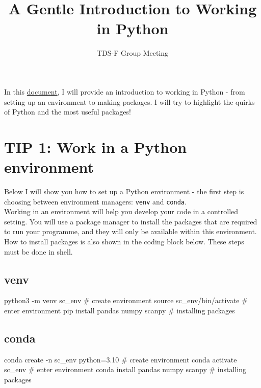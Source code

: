 \documentclass[
  letterpaper,
  DIV=11,
  numbers=noendperiod]{scrartcl}
\title{A Gentle Introduction to Working in Python}
\subtitle{TDS-F Group Meeting}
\author{}
\date{}
\newenvironment{Shaded}{\begin{snugshade}}{\end{snugshade}}
\newcommand{\AttributeTok}[1]{\textcolor[rgb]{0.40,0.45,0.13}{#1}}
\newcommand{\BuiltInTok}[1]{\textcolor[rgb]{0.00,0.23,0.31}{#1}}
\newcommand{\CommentTok}[1]{\textcolor[rgb]{0.37,0.37,0.37}{#1}}
\newcommand{\ExtensionTok}[1]{\textcolor[rgb]{0.00,0.23,0.31}{#1}}
\newcommand{\NormalTok}[1]{\textcolor[rgb]{0.00,0.23,0.31}{#1}}
\renewcommand*\contentsname{Table of contents}
\newcommand\contentsname{Table of contents}
\begin{document}
\maketitle

\renewcommand*\contentsname{Table of contents}
{
\hypersetup{linkcolor=}
\setcounter{tocdepth}{3}
\tableofcontents
}

In this
\href{https://tkjmk.github.io/PyBestPractices_SIB/PythonIntro_SIB.html}{document},
I will provide an introduction to working in Python - from setting up an
environment to making packages. I will try to highlight the quirks of
Python and the most useful packages!

\section{TIP 1: Work in a Python
environment}\label{tip-1-work-in-a-python-environment}

Below I will show you how to set up a Python environment - the first
step is choosing between environment managers: \texttt{venv} and
\texttt{conda}.\\

Working in an environment will help you develop your code in a
controlled setting. You will use a package manager to install the
packages that are required to run your programme, and they will only be
available within this environment. How to install packages is also shown
in the coding block below. These steps must be done in shell.

\subsection{venv}

\begin{Shaded}
\begin{Highlighting}[]
\ExtensionTok{python3} \AttributeTok{{-}m}\NormalTok{ venv sc\_env }\CommentTok{\# create environment}
\BuiltInTok{source}\NormalTok{ sc\_env/bin/activate }\CommentTok{\# enter environment}
\ExtensionTok{pip}\NormalTok{ install pandas numpy scanpy }\CommentTok{\# installing packages}
\end{Highlighting}
\end{Shaded}

\subsection{conda}

\begin{Shaded}
\begin{Highlighting}[]
\ExtensionTok{conda}\NormalTok{ create }\AttributeTok{{-}n}\NormalTok{ sc\_env python=3.10 }\CommentTok{\# create environment}
\ExtensionTok{conda}\NormalTok{ activate sc\_env }\CommentTok{\# enter environment}
\ExtensionTok{conda}\NormalTok{ install pandas numpy scanpy }\CommentTok{\# installing packages}
\end{Highlighting}
\end{Shaded}
\end{document}
